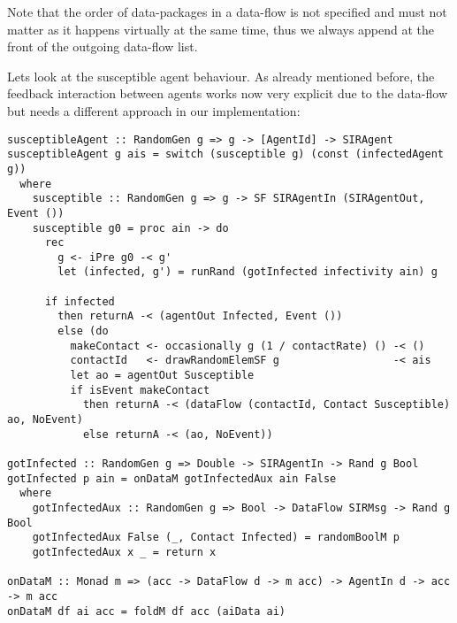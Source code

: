 Note that the order of data-packages in a data-flow is not specified and must not matter as it happens virtually at the same time, thus we always append at the front of the outgoing data-flow list.

Lets look at the susceptible agent behaviour. As already mentioned before, the feedback interaction between agents works now very explicit due to the data-flow but needs a different approach in our implementation:

\begin{verbatim}
susceptibleAgent :: RandomGen g => g -> [AgentId] -> SIRAgent
susceptibleAgent g ais = switch (susceptible g) (const (infectedAgent g))
  where
    susceptible :: RandomGen g => g -> SF SIRAgentIn (SIRAgentOut, Event ())
    susceptible g0 = proc ain -> do
      rec
        g <- iPre g0 -< g'
        let (infected, g') = runRand (gotInfected infectivity ain) g

      if infected 
        then returnA -< (agentOut Infected, Event ())
        else (do
          makeContact <- occasionally g (1 / contactRate) () -< ()
          contactId   <- drawRandomElemSF g                  -< ais
          let ao = agentOut Susceptible
          if isEvent makeContact
            then returnA -< (dataFlow (contactId, Contact Susceptible) ao, NoEvent)
            else returnA -< (ao, NoEvent))
            
gotInfected :: RandomGen g => Double -> SIRAgentIn -> Rand g Bool
gotInfected p ain = onDataM gotInfectedAux ain False
  where
    gotInfectedAux :: RandomGen g => Bool -> DataFlow SIRMsg -> Rand g Bool
    gotInfectedAux False (_, Contact Infected) = randomBoolM p
    gotInfectedAux x _ = return x
    
onDataM :: Monad m => (acc -> DataFlow d -> m acc) -> AgentIn d -> acc -> m acc
onDataM df ai acc = foldM df acc (aiData ai)
\end{verbatim}

